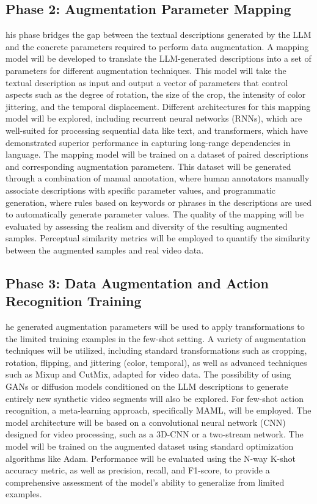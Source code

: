 \subsection*{Phase 2: Augmentation Parameter Mapping}
his phase bridges the gap between the textual descriptions generated by the LLM and the concrete parameters required to perform data augmentation. A mapping model will be developed to translate the LLM-generated descriptions into a set of parameters for different augmentation techniques. This model will take the textual description as input and output a vector of parameters that control aspects such as the degree of rotation, the size of the crop, the intensity of color jittering, and the temporal displacement. Different architectures for this mapping model will be explored, including recurrent neural networks (RNNs), which are well-suited for processing sequential data like text, and transformers, which have demonstrated superior performance in capturing long-range dependencies in language. The mapping model will be trained on a dataset of paired descriptions and corresponding augmentation parameters. This dataset will be generated through a combination of manual annotation, where human annotators manually associate descriptions with specific parameter values, and programmatic generation, where rules based on keywords or phrases in the descriptions are used to automatically generate parameter values. The quality of the mapping will be evaluated by assessing the realism and diversity of the resulting augmented samples. Perceptual similarity metrics will be employed to quantify the similarity between the augmented samples and real video data.

\subsection*{Phase 3: Data Augmentation and Action Recognition Training}
he generated augmentation parameters will be used to apply transformations to the limited training examples in the few-shot setting. A variety of augmentation techniques will be utilized, including standard transformations such as cropping, rotation, flipping, and jittering (color, temporal), as well as advanced techniques such as Mixup and CutMix, adapted for video data. The possibility of using GANs or diffusion models conditioned on the LLM descriptions to generate entirely new synthetic video segments will also be explored. For few-shot action recognition, a meta-learning approach, specifically MAML, will be employed. The model architecture will be based on a convolutional neural network (CNN) designed for video processing, such as a 3D-CNN or a two-stream network. The model will be trained on the augmented dataset using standard optimization algorithms like Adam. Performance will be evaluated using the N-way K-shot accuracy metric, as well as precision, recall, and F1-score, to provide a comprehensive assessment of the model's ability to generalize from limited examples.

